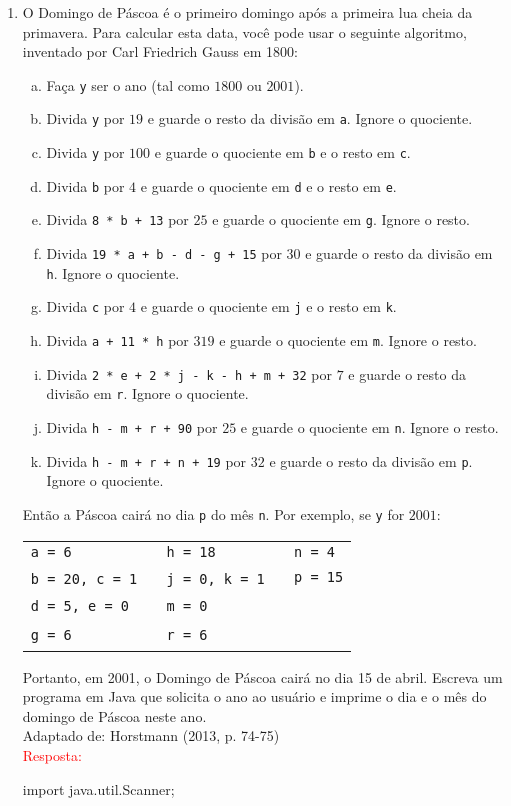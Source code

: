 \documentclass[onecolumn,a4paper,10pt]{report}
\newcommand{\+}{\, + \,}
\newcommand{\<}{\hspace*{-0.4cm}}
\begin{document}
\begin{enumerate}[1.]
\item O Domingo de Páscoa é o primeiro domingo após a primeira lua cheia da primavera. Para calcular esta data, você pode usar o seguinte algoritmo, inventado por Carl Friedrich Gauss em 1800:
\begin{enumerate}[a)]
	\item Faça \texttt{y} ser o ano (tal como $1800$ ou $2001$).
	\item Divida \texttt{y} por $19$ e guarde o resto da divisão em \texttt{a}. Ignore o quociente.
	\item Divida \texttt{y} por $100$ e guarde o quociente em \texttt{b} e o resto em \texttt{c}.
	\item Divida \texttt{b} por $4$ e guarde o quociente em \texttt{d} e o resto em \texttt{e}.
	\item Divida \texttt{8 * b + 13} por $25$ e guarde o quociente em \texttt{g}. Ignore o resto.
	\item Divida \texttt{19 * a + b - d - g + 15} por $30$ e guarde o resto da divisão em \texttt{h}. Ignore o quociente.
	\item Divida \texttt{c} por $4$ e guarde o quociente em \texttt{j} e o resto em \texttt{k}.
	\item Divida \texttt{a + 11 * h} por $319$ e guarde o quociente em \texttt{m}. Ignore o resto.
	\item Divida \texttt{2 * e + 2 * j - k - h + m + 32} por $7$ e guarde o resto da divisão em \texttt{r}. Ignore o quociente.
	\item Divida \texttt{h - m + r + 90} por $25$ e guarde o quociente em \texttt{n}. Ignore o resto.
	\item Divida \texttt{h - m + r + n + 19} por $32$ e guarde o resto da divisão em \texttt{p}. Ignore o quociente.
\end{enumerate}
Então a Páscoa cairá no dia \texttt{p} do mês \texttt{n}. Por exemplo, se \texttt{y} for $2001$:
\begin{center}
\begin{tabular}{lll}
\texttt{a = 6}         & \texttt{h = 18}       & \texttt{n = 4} \\
\texttt{b = 20, c = 1} ~ & \texttt{j = 0, k = 1} ~ & \texttt{p = 15} \\
\texttt{d = 5, e = 0}  & \texttt{m = 0}        & ~ \\
\texttt{g = 6}         & \texttt{r = 6}        & ~ \\
\end{tabular}
\end{center}
Portanto, em 2001, o Domingo de Páscoa cairá no dia 15 de abril. Escreva um programa em Java que solicita o ano ao usuário e imprime o dia e o mês do domingo de Páscoa neste ano.\\
{\tiny Adaptado de: Horstmann (2013, p. 74-75)}\\
\textcolor{red}{Resposta:}\\
\begin{javacode}
import java.util.Scanner;


\end{javacode}
\end{enumerate}
\end{document}
